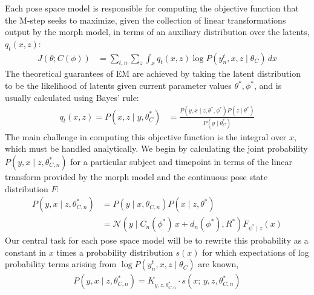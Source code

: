 \documentclass{article}         %
\newcommand{\NN}{\mathcal{N}}
\begin{document}
Each pose space model is responsible for computing the objective function that the M-step seeks to maximize, given the collection of linear transformations output by the morph model, in terms of an auxiliary distribution over the latents, $q_t(x, z)$:
\begin{align}
    J(\theta; C(\phi)) &= \sum_{t, n}\sum_z \int_x q_t(x, z) \log P(y^t_n, x, z \mid \theta_C) \, dx 
    \label{eq:obj-general}
\end{align}
The theoretical guarantees of EM are achieved by taking the latent distribution to be the likelihood of latents given current parameter values $\theta^*, \phi^*$, and is usually calculated using Bayes' rule:
\begin{align}
    q_t(x, z) = P(x, z \mid y, \theta_C^*) &= \frac{P(y, x \mid z, \theta^*, \phi^*) P(z\mid \theta^*)}{P(y \mid \theta_C^*)}
    \label{eq:q-general}
\end{align}
The main challenge in computing this objective function is the integral over $x$, which must be handled analytically. We begin by calculating the joint probability $P(y, x \mid z, \theta_{C,n}^*)$ for a particular subject and timepoint in terms of the linear transform provided by the morph model and the continuous pose state distribution $F$:
\begin{align}
    P(y, x \mid z, \theta_{C, n}^*) &= P(y \mid x, \theta_{C, n}) P(x\mid z, \theta^*) \\
    &= \NN(y\mid C_n(\phi^*)\, x + d_n(\phi^*), R^*) F_{\psi^*\mid z}(x) \label{eq:norm-F-prod}
\end{align}
Our central task for each pose space model will be to rewrite this probability as a constant in $x$ times a probability distribution $s(x)$ for which expectations of log probability terms arising from $\log P(y^t_n, x, z \mid \theta_C)$ are known,
\begin{align}
    P(y, x \mid z, \theta^*_{C, n}) = K_{y, z, \theta^*_{C, n}}\cdot s(x;\, y, z, \theta^*_{C, n})
    \label{eq:s-defn}
\end{align}
\end{document}
